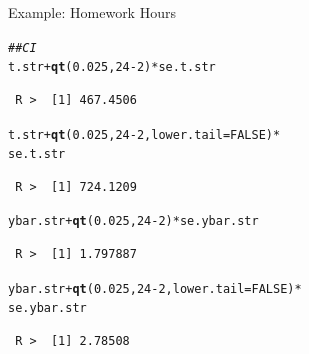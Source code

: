 \documentclass[10pt]{beamer}\usepackage[]{graphicx}\usepackage[]{xcolor}
\makeatletter
\newcommand{\hlnum}[1]{\textcolor[rgb]{0.686,0.059,0.569}{#1}}%
\newcommand{\hlcom}[1]{\textcolor[rgb]{0.678,0.584,0.686}{\textit{#1}}}%
\newcommand{\hlopt}[1]{\textcolor[rgb]{0,0,0}{#1}}%
\newcommand{\hlstd}[1]{\textcolor[rgb]{0.345,0.345,0.345}{#1}}%
\newcommand{\hlkwc}[1]{\textcolor[rgb]{0.333,0.667,0.333}{#1}}%
\newcommand{\hlkwd}[1]{\textcolor[rgb]{0.737,0.353,0.396}{\textbf{#1}}}%
\newenvironment{kframe}{%
 \def\at@end@of@kframe{}%
 \ifinner\ifhmode%
  \def\at@end@of@kframe{\end{minipage}}%
  \begin{minipage}{\columnwidth}%
 \fi\fi%
 \def\FrameCommand##1{\hskip\@totalleftmargin \hskip-\fboxsep
 \colorbox{shadecolor}{##1}\hskip-\fboxsep
     \hskip-\linewidth \hskip-\@totalleftmargin \hskip\columnwidth}%
 \MakeFramed {\advance\hsize-\width
   \@totalleftmargin\z@ \linewidth\hsize
   \@setminipage}}%
 {\par\unskip\endMakeFramed%
 \at@end@of@kframe}
\newenvironment{knitrout}{}{} %
\makeatother
\begin{document}
\begin{frame}[containsverbatim]{Example: Homework Hours}
\small
\begin{knitrout}
\color{fgcolor}\begin{kframe}
\begin{alltt}
\hlcom{## CI}
\hlstd{t.str} \hlopt{+} \hlkwd{qt}\hlstd{(}\hlnum{0.025}\hlstd{,} \hlnum{24} \hlopt{-} \hlnum{2}\hlstd{)} \hlopt{*} \hlstd{se.t.str}
\end{alltt}
\begin{verbatim}
 R >  [1] 467.4506
\end{verbatim}
\begin{alltt}
\hlstd{t.str} \hlopt{+} \hlkwd{qt}\hlstd{(}\hlnum{0.025}\hlstd{,} \hlnum{24} \hlopt{-} \hlnum{2}\hlstd{,} \hlkwc{lower.tail} \hlstd{=} \hlnum{FALSE}\hlstd{)} \hlopt{*}
    \hlstd{se.t.str}
\end{alltt}
\begin{verbatim}
 R >  [1] 724.1209
\end{verbatim}
\begin{alltt}
\hlstd{ybar.str} \hlopt{+} \hlkwd{qt}\hlstd{(}\hlnum{0.025}\hlstd{,} \hlnum{24} \hlopt{-} \hlnum{2}\hlstd{)} \hlopt{*} \hlstd{se.ybar.str}
\end{alltt}
\begin{verbatim}
 R >  [1] 1.797887
\end{verbatim}
\begin{alltt}
\hlstd{ybar.str} \hlopt{+} \hlkwd{qt}\hlstd{(}\hlnum{0.025}\hlstd{,} \hlnum{24} \hlopt{-} \hlnum{2}\hlstd{,} \hlkwc{lower.tail} \hlstd{=} \hlnum{FALSE}\hlstd{)} \hlopt{*}
    \hlstd{se.ybar.str}
\end{alltt}
\begin{verbatim}
 R >  [1] 2.78508
\end{verbatim}
\end{kframe}
\end{knitrout}
\end{frame}
\end{document}
